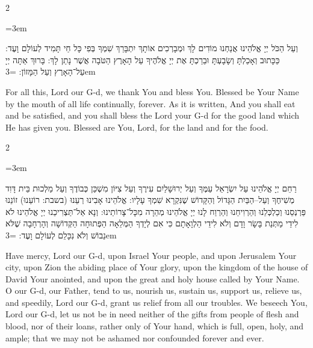 \documentclass[11pt, openany]{book}
\newenvironment{bilingual}{%
  \par\vspace{4pt}%
  \begin{paracol}{2}%
}{%
  \end{paracol}%
  \par\vspace{2pt}%
}
\newenvironment{hebrewcol}{%
  \switchcolumn[1]%
  \begingroup
  \RTL
  \hebrewfont\large
  \setstretch{1.4}%
  \emergencystretch=3em
  \tolerance=9999
  \parindent=0pt\relax
}{%
  \endRTL
  \endgroup
}
\newenvironment{englishcol}{%
  \switchcolumn[0]%
  \begingroup
  \setstretch{1.4}%
  \emergencystretch=3em
  \tolerance=9999
  \normalsize
  \rightskip=0.12in\relax
}{%
  \endgroup
}
\begin{document}
\begin{bilingual}
\begin{hebrewcol}
וְעַל הַכֹּל יְיָ אֱלֹהֵינוּ אֲנַחְנוּ מוֹדִים לָךְ וּמְבָרְכִים אוֹתָךְ יִתְבָּרֵךְ שִׁמְךָ בְּפִי כָּל חַי תָּמִיד לְעוֹלָם וָעֶד: כַּכָּתוּב וְאָכַלְתָּ וְשָׂבָעְתָּ וּבֵרַכְתָּ אֶת יְיָ אֱלֹהֶיךָ עַל הָאָרֶץ הַטֹּבָה אֲשֶׁר נָתַן לָךְ: בָּרוּךְ אַתָּה יְיָ עַל־הָאָרֶץ וְעַל הַמָּזוֹן:
\end{hebrewcol}
\begin{englishcol}
For all this, Lord our G-d, we thank You and bless You. Blessed be Your Name by the mouth of all life continually, forever. As it is written, And you shall eat and be satisfied, and you shall bless the Lord your G-d for the good land which He has given you. Blessed are You, Lord, for the land and for the food.
\end{englishcol}
\end{bilingual}
\begin{bilingual}
\begin{hebrewcol}
רַחֵם יְיָ אֱלֹהֵינוּ עַל יִשְׂרָאֵל עַמֶּךָ וְעַל יְרוּשָׁלַיִם עִירֶךָ וְעַל צִיּוֹן מִשְׁכַּן כְּבוֹדֶךָ וְעַל מַלְכוּת בֵּית דָּוִד מְשִׁיחֶךָ וְעַל–הַבַּיִת הַגָּדוֹל וְהַקָּדוֹשׁ שֶׁנִּקְרָא שִׁמְךָ עָלָיו: אֱלֹהֵינוּ אָבִינוּ רְעֵנוּ (בשבת: רוֹעֵנוּ) זוֹנֵנוּ פַּרְנְסֵנוּ וְכַלְכְּלֵנוּ וְהַרְוִיחֵנוּ וְהַרְוַח לָנוּ יְיָ אֱלֹהֵינוּ מְהֵרָה מִכָּל־צָרוֹתֵינוּ: וְנָא אַל־תַּצְרִיכֵנוּ יְיָ אֱלֹהֵינוּ לֹא לִידֵי מַתְּנַת בָּשָׂר וָדָם וְלֹא לִידֵי הַלְוָאָתָם כִּי אִם לְיָדְךָ הַמְּלֵאָה הַפְּתוּחָה הַקְּדוֹשָׁה וְהָרְחָבָה שֶׁלֹּא נֵבוֹשׁ וְלֹא נִכָּלֵם לְעוֹלָם וָעֶד:
\end{hebrewcol}
\begin{englishcol}
Have mercy, Lord our G-d, upon Israel Your people, and upon Jerusalem Your city, upon Zion the abiding place of Your glory, upon the kingdom of the house of David Your anointed, and upon the great and holy house called by Your Name. O our G-d, our Father, tend to us, nourish us, sustain us, support us, relieve us, and speedily, Lord our G-d, grant us relief from all our troubles. We beseech You, Lord our G-d, let us not be in need neither of the gifts from people of flesh and blood, nor of their loans, rather only of Your hand, which is full, open, holy, and ample; that we may not be ashamed nor confounded forever and ever.
\end{englishcol}
\end{bilingual}
\end{document}
